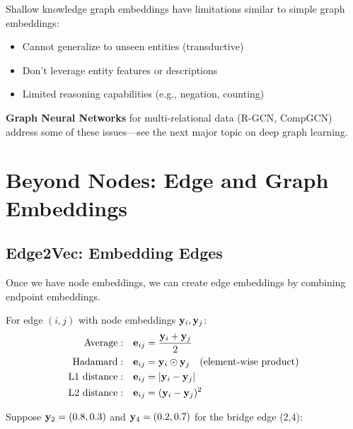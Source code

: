 \begin{notechapter}
\begin{remark}
Shallow knowledge graph embeddings have limitations similar to simple graph embeddings:
\begin{itemize}
    \item Cannot generalize to unseen entities (transductive)
    \item Don't leverage entity features or descriptions
    \item Limited reasoning capabilities (e.g., negation, counting)
\end{itemize}
\textbf{Graph Neural Networks} for multi-relational data (R-GCN, CompGCN) address some of these issues---see the next major topic on deep graph learning.
\end{remark}


\section{Beyond Nodes: Edge and Graph Embeddings}

\subsection{Edge2Vec: Embedding Edges}

Once we have node embeddings, we can create edge embeddings by combining endpoint embeddings.

\begin{definition}
For edge $(i, j)$ with node embeddings $\mathbf{y}_i, \mathbf{y}_j$:
\begin{align*}
\text{Average}: & \quad \mathbf{e}_{ij} = \frac{\mathbf{y}_i + \mathbf{y}_j}{2} \\
\text{Hadamard}: & \quad \mathbf{e}_{ij} = \mathbf{y}_i \odot \mathbf{y}_j \quad \text{(element-wise product)} \\
\text{L1 distance}: & \quad \mathbf{e}_{ij} = |\mathbf{y}_i - \mathbf{y}_j| \\
\text{L2 distance}: & \quad \mathbf{e}_{ij} = (\mathbf{y}_i - \mathbf{y}_j)^2
\end{align*}
\end{definition}

\begin{example}
Suppose $\mathbf{y}_2 = (0.8, 0.3)$ and $\mathbf{y}_4 = (0.2, 0.7)$ for the bridge edge (2,4):


\end{example}
\end{notechapter}
